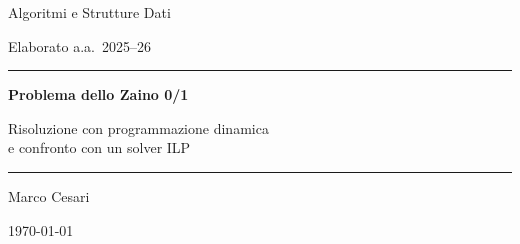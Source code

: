 \documentclass[11pt]{article}
\begin{document}
\begin{titlepage}
\centering
\vspace*{2cm}
{\sffamily\color{asdblu}\Large Algoritmi e Strutture Dati\par}
{\sffamily\color{asdblu}\large Elaborato a.a.\ 2025--26\par}
\vspace{2.6cm}
\rule{\linewidth}{1pt}\par\vspace{8pt}
{\sffamily\color{asdblu}\Huge\bfseries Problema dello Zaino 0/1\par}
\vspace{10pt}
{\sffamily\large Risoluzione con programmazione dinamica\\[2pt]
e confronto con un solver ILP\par}
\vspace{8pt}\rule{\linewidth}{1pt}
\vspace{2.6cm}

{\large Marco Cesari\par}
\vfill
{\large \today\par}
\end{titlepage}

\renewcommand{\contentsname}{\sffamily\color{asdblu}Indice}
\tableofcontents
\clearpage

\setlength{\parindent}{0pt}
\setlength{\parskip}{0.55\baselineskip plus 2pt minus 1pt}
\titlespacing*{\section}{0pt}{1.4em}{0pt}
\titlespacing*{\subsection}{0pt}{1.2em}{0pt}
\titlespacing*{\subsubsection}{0pt}{1.0em}{0pt}
\end{document}
